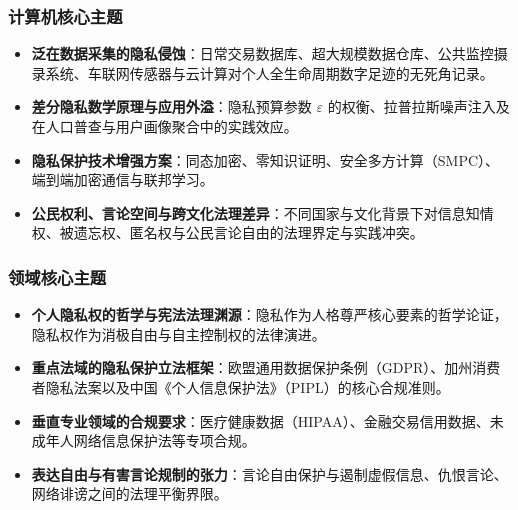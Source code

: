 \subsubsection{计算机核心主题}
\begin{itemize}
    \item \textbf{泛在数据采集的隐私侵蚀}：日常交易数据库、超大规模数据仓库、公共监控摄录系统、车联网传感器与云计算对个人全生命周期数字足迹的无死角记录。
    \item \textbf{差分隐私数学原理与应用外溢}：隐私预算参数 $\varepsilon$ 的权衡、拉普拉斯噪声注入及在人口普查与用户画像聚合中的实践效应。
    \item \textbf{隐私保护技术增强方案}：同态加密、零知识证明、安全多方计算（SMPC）、端到端加密通信与联邦学习。
    \item \textbf{公民权利、言论空间与跨文化法理差异}：不同国家与文化背景下对信息知情权、被遗忘权、匿名权与公民言论自由的法理界定与实践冲突。
\end{itemize}

\subsubsection{领域核心主题}
\begin{itemize}
    \item \textbf{个人隐私权的哲学与宪法法理渊源}：隐私作为人格尊严核心要素的哲学论证，隐私权作为消极自由与自主控制权的法律演进。
    \item \textbf{重点法域的隐私保护立法框架}：欧盟通用数据保护条例（GDPR）、加州消费者隐私法案以及中国《个人信息保护法》（PIPL）的核心合规准则。
    \item \textbf{垂直专业领域的合规要求}：医疗健康数据（HIPAA）、金融交易信用数据、未成年人网络信息保护法等专项合规。
    \item \textbf{表达自由与有害言论规制的张力}：言论自由保护与遏制虚假信息、仇恨言论、网络诽谤之间的法理平衡界限。
\end{itemize}

